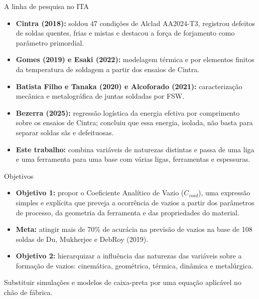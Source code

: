 \documentclass[aspectratio=169,11pt]{beamer}
\newenvironment{bullets}{\begin{itemize}\setlength{\itemsep}{5pt}}{\end{itemize}}
\newcommand{\caixa}[1]{\colorbox{fundocaixa}{\parbox{0.92\linewidth}{\centering #1}}}
\begin{document}
\begin{frame}{A linha de pesquisa no ITA}
\begin{bullets}
  \item \textbf{Cintra (2018):} soldou 47 condições de Alclad AA2024-T3, registrou defeitos de soldas quentes, frias e mistas e destacou a força de forjamento como parâmetro primordial.
  \item \textbf{Gomes (2019) e Esaki (2022):} modelagem térmica e por elementos finitos da temperatura de soldagem a partir dos ensaios de Cintra.
  \item \textbf{Batista Filho e Tanaka (2020) e Alcoforado (2021):} caracterização mecânica e metalográfica de juntas soldadas por FSW.
  \item \textbf{Bezerra (2025):} regressão logística da energia efetiva por comprimento sobre os ensaios de Cintra; concluiu que essa energia, isolada, não basta para separar soldas sãs e defeituosas.
  \item \textbf{Este trabalho:} combina variáveis de naturezas distintas e passa de uma liga e uma ferramenta para uma base com várias ligas, ferramentas e espessuras.
\end{bullets}
\end{frame}

\begin{frame}{Objetivos}
\vspace{0.3cm}
\begin{bullets}
  \item \textbf{Objetivo 1:} propor o Coeficiente Analítico de Vazio ($C_{void}$), uma expressão simples e explícita que preveja a ocorrência de vazios a partir dos parâmetros de processo, da geometria da ferramenta e das propriedades do material.
  \item \textbf{Meta:} atingir mais de 70\% de acurácia na previsão de vazios na base de 108 soldas de Du, Mukherjee e DebRoy (2019).
  \item \textbf{Objetivo 2:} hierarquizar a influência das naturezas das variáveis sobre a formação de vazios: cinemática, geométrica, térmica, dinâmica e metalúrgica.
\end{bullets}
\vspace{0.4cm}
\caixa{\small Substituir simulações e modelos de caixa-preta por uma equação aplicável no chão de fábrica.}
\end{frame}

\end{document}
